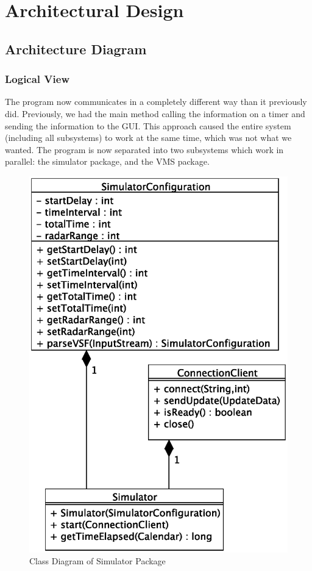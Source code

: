 \documentclass{article}
\begin{document}
\section{Architectural Design} %

\subsection{Architecture Diagram} %

\subsubsection{Logical View} %

The program now communicates in a completely different way than it previously did. Previously, we had the main method calling the information on a timer and sending the information to the GUI. This approach caused the entire system (including all subsystems) to work at the same time, which was not what we wanted. The program is now separated into two subsystems which work in parallel: the simulator package, and the VMS package.

\begin{figure}[!htb]
\caption{Class Diagram of Simulator Package}
\centering
\includegraphics[scale=0.5]{diagrams/simulator-class-diagram.eps}
\end{figure}
\end{document}
